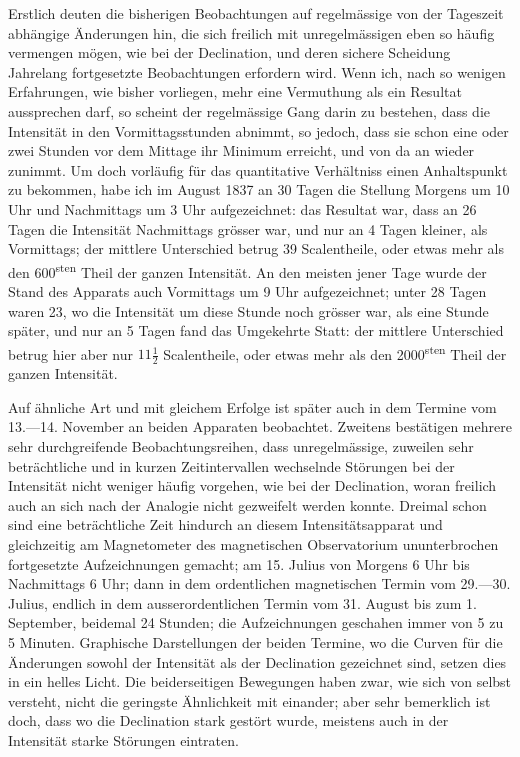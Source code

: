 Erstlich deuten die bisherigen Beobachtungen auf regelmässige von der Tageszeit abhängige Änderungen hin, die sich freilich mit unregelmässigen eben so häufig vermengen mögen, wie bei der Declination, und deren sichere Scheidung
Jahrelang fortgesetzte Beobachtungen erfordern wird. Wenn ich, nach so wenigen Erfahrungen, wie bisher vorliegen, mehr eine Vermuthung als ein Resultat aussprechen darf, so scheint der regelmässige Gang darin zu bestehen, dass die Intensität in den Vormittagsstunden abnimmt, so jedoch, dass sie schon eine oder zwei Stunden vor dem Mittage ihr Minimum erreicht, und von da an wieder zunimmt. Um doch vorläufig für das quantitative Verhältniss einen Anhaltspunkt zu bekommen, habe ich im August 1837 an 30 Tagen die Stellung Morgens um 10 Uhr und Nachmittags um 3 Uhr aufgezeichnet: das Resultat war, dass an 26 Tagen die Intensität Nachmittags grösser war, und nur an 4 Tagen kleiner, als Vormittags; der mittlere Unterschied betrug 39 Scalentheile, oder etwas mehr als den 600\textsuperscript{sten} Theil der ganzen Intensität. An den meisten jener Tage wurde der Stand des Apparats auch Vormittags um 9 Uhr aufgezeichnet; unter 28 Tagen waren 23, wo die Intensität um diese Stunde noch grösser war, als eine Stunde später, und nur an 5 Tagen fand das Umgekehrte Statt: der mittlere Unterschied betrug hier aber nur $11\frac{1}{2}$ Scalentheile, oder etwas mehr als den 2000\textsuperscript{sten} Theil der ganzen Intensität.

\expandafter\def\csname HistoricalNoteText371\endcsname{Auf ähnliche Art und mit gleichem Erfolge ist später auch in dem Termine vom 13.---14. November an beiden Apparaten beobachtet.}
Zweitens bestätigen mehrere sehr durchgreifende Beobachtungsreihen, dass unregelmässige, zuweilen sehr beträchtliche und in kurzen Zeitintervallen wechselnde Störungen bei der Intensität nicht weniger häufig vorgehen, wie bei der Declination, woran freilich auch an sich nach der Analogie nicht gezweifelt werden konnte. Dreimal schon sind eine beträchtliche Zeit hindurch an diesem Intensitätsapparat und gleichzeitig am Magnetometer des magnetischen Observatorium ununterbrochen fortgesetzte Aufzeichnungen gemacht; am 15. Julius von Morgens 6 Uhr bis Nachmittags 6 Uhr; dann in dem ordentlichen magnetischen Termin vom 29.---30. Julius, endlich in dem ausserordentlichen Termin vom 31. August bis zum 1. September, beidemal 24 Stunden; die Aufzeichnungen geschahen immer von 5 zu 5 Minuten. Graphische Darstellungen der beiden Termine, wo die Curven für die Änderungen sowohl der Intensität als der Declination gezeichnet sind, setzen dies in ein helles Licht. Die beiderseitigen Bewegungen haben zwar, wie sich von selbst versteht, nicht die geringste Ähnlichkeit mit einander; aber sehr bemerklich ist doch, dass wo die Declination stark gestört wurde, meistens auch in der Intensität starke Störungen eintraten.
